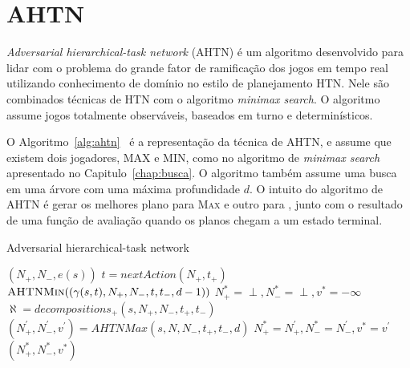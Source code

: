 \section{AHTN} 

\textit{Adversarial hierarchical-task network} (AHTN) é um algoritmo desenvolvido para lidar com o problema do grande fator de ramificação dos jogos em tempo real~\cite{ontanon2015adversarial} utilizando conhecimento de domínio no estilo de planejamento HTN. 
Nele são combinados técnicas de HTN com o algoritmo \textit{minimax search}. 
O algoritmo assume jogos totalmente observáveis, baseados em turno e determinísticos. 

O Algoritmo~\ref{alg:ahtn}~\cite{ontanon2015adversarial} é a representação da técnica de AHTN, e assume que existem dois jogadores, MAX e MIN, como no algoritmo de \textit{minimax search} apresentado no Capitulo~\ref{chap:busca}.
O algoritmo também assume uma busca em uma árvore com uma máxima profundidade $d$. 
O intuito do algoritmo de AHTN é gerar os melhores plano para \textsc{Max} e outro para , junto com o resultado de uma função de avaliação quando os planos chegam a um estado terminal.  

\begin{algorithm}
	\caption{Adversarial hierarchical-task network}
	\label{alg:ahtn}
	\begin{algorithmic}[1]		
		\label{alg:lin:firstLine}
		\State	\Return $(N_{+}, N_{-}, e(s))$
		\EndIf
		 \label{alg:ahtn:nexaction}
		\State $t = nextAction(N_{+}, t_{+})$ 
		\State \Return $\Call{AHTNMin}{(\gamma(s,t), N_{+}, N_{-}, t, t_{-}, d-1)}$ \label{alg:ahtn:troca}%
		\EndIf
		\State $N_{+}^{*} = \perp, N_{-}^{*} = \perp, v^{*} = -\infty$
		\State $\aleph = decompositions_{+}(s, N_{+}, N_{-}, t_{+}, t_{-})$ \label{alg:decompositions}
		 \label{alg:ahtn:for}
		\State $(N^{'}_{+}, N^{'}_{-}, v^{'}) = AHTNMax(s, N, N_{-}, t_{+}, t_{-}, d)$
		\State $N_{+}^{*} = N^{'}_{+}, N_{-}^{*} = N^{'}_{-}, v^{*} = v^{'} $
		\EndIf
		\EndFor		
		\State \Return $(N_{+}^{*}, N_{-}^{*}, v^{*} )$
		\EndFunction
	\end{algorithmic}
\end{algorithm}

